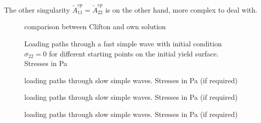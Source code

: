 The other singularity $\tilde{A}^{ep}_{11}=\tilde{A}^{ep}_{22}$ is on the other hand, more complex to deal with.


\begin{figure}[h!]
  \centering
   \qquad
  \caption{comparison between Clifton and own solution}
\end{figure}

\begin{figure}[h!]
  \centering
  \caption{Loading paths through a fast simple wave with initial condition $\sigma_{22}=0$ for different starting points on the initial yield surface. Stresses in Pa}
  \label{fig:fast_path_plane_strains}
\end{figure}


\begin{figure}[h!]
  \centering
  \caption{loading paths through slow simple waves. Stresses in Pa (if required)}
  \label{fig:slow_path_plane_strains}
\end{figure}

\begin{figure}[h!]
  \centering
  \caption{loading paths through slow simple waves. Stresses in Pa (if required)}
  \label{fig:slow_path_plane_strains}
\end{figure}


\begin{figure}[h!]
  \centering
  \caption{loading paths through slow simple waves. Stresses in Pa (if required)}
  \label{fig:slow_path_plane_strains}
\end{figure}



